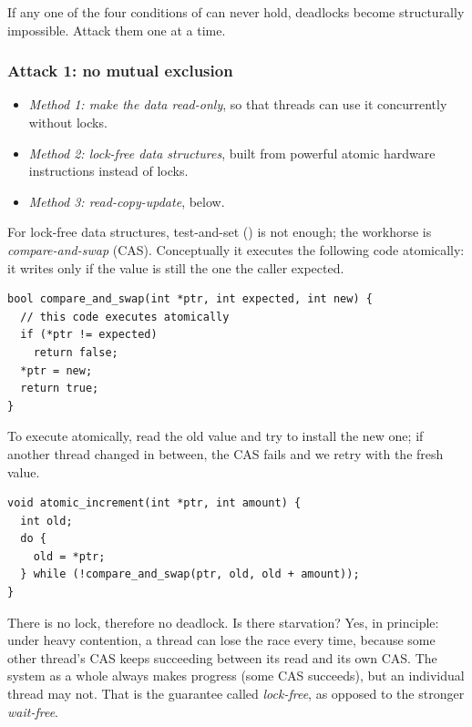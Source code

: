 If any one of the four conditions of  can never hold, deadlocks become structurally impossible. Attack them one at a time.

\subsubsection{Attack 1: no mutual exclusion}
\begin{itemize}
  \item \emph{Method 1: make the data read-only}, so that threads can use it concurrently without locks.
  \item \emph{Method 2: lock-free data structures}, built from powerful atomic hardware instructions instead of locks.
  \item \emph{Method 3: read-copy-update}, below.
\end{itemize}
For lock-free data structures, test-and-set () is not enough; the workhorse is \emph{compare-and-swap} (CAS). Conceptually it executes the following code atomically: it writes  only if the value is still the one the caller expected.
\begin{lstlisting}
bool compare_and_swap(int *ptr, int expected, int new) {
  // this code executes atomically
  if (*ptr != expected)
    return false;
  *ptr = new;
  return true;
}
\end{lstlisting}

\begin{example}
  To execute  atomically, read the old value and try to install the new one; if another thread changed  in between, the CAS fails and we retry with the fresh value.
\begin{lstlisting}
void atomic_increment(int *ptr, int amount) {
  int old;
  do {
    old = *ptr;
  } while (!compare_and_swap(ptr, old, old + amount));
}
\end{lstlisting}
  There is no lock, therefore no deadlock. Is there starvation? Yes, in principle: under heavy contention, a thread can lose the race every time, because some other thread's CAS keeps succeeding between its read and its own CAS. The system as a whole always makes progress (some CAS succeeds), but an individual thread may not. That is the guarantee called \emph{lock-free}, as opposed to the stronger \emph{wait-free}.
\end{example}

